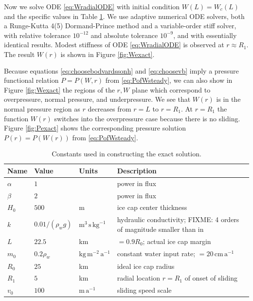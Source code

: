 \documentclass[11pt,final]{amsart}
\begin{document}
Now we solve ODE \eqref{eq:WradialODE} with initial condition $W(L)=W_c(L)$ and the specific values in Table \ref{tab:verifconstants}.  We use adaptive numerical ODE solvers, both a Runge-Kutta 4(5) Dormand-Prince method and a variable-order stiff solver, with relative tolerance $10^{-12}$ and absolute tolerance $10^{-9}$, and with essentially identical results.  Modest stiffness \citep{AscherPetzold} of ODE \eqref{eq:WradialODE} is observed at $r\approx R_1$.  The result $W(r)$ is shown in Figure \ref{fig:Wexact}.

Because equations \eqref{eq:choosebodvardssonh} and \eqref{eq:choosevb} imply a pressure functional relation $P=P(W,r)$ from \eqref{eq:PofWsteady}, we can also show in Figure \ref{fig:Wexact} the regions of the $r,W$ plane which correspond to overpressure, normal pressure, and underpressure.  We see that $W(r)$ is in the normal pressure region as $r$ decreases from $r=L$ to $r=R_1$.  At $r=R_1$ the function $W(r)$ switches into the overpressure case because there is no sliding.  Figure \ref{fig:Pexact} shows the corresponding pressure solution $P(r)=P(W(r))$ from \eqref{eq:PofWsteady}.

\begin{table}[ht]
  \centering
  \caption{Constants used in constructing the exact solution.}
  \begin{tabular}{lllp{3.0in}}
    \textbf{Name} & \textbf{Value} & \textbf{Units} & \textbf{Description}\\
\hline
    $\alpha$ & $1$ & & power in flux \\
    $\beta$  & $2$ & & power in flux \\
    $H_0$ & $500$ & m & ice cap center thickness \\
    $k$   & $0.01/(\rho_w g)$ & $\text{m}^3\,\text{s}\,\text{kg}^{-1}$ & hydraulic conductivity; FIXME: 4 orders of magnitude smaller than in \cite{Hewittetal2012} \\
    $L$   & $22.5$& km & $=0.9 R_0$; actual ice cap margin \\
    $m_0$ & $0.2\rho_w$ & $\text{kg}\,\text{m}^{-2}\,\text{a}^{-1}$ & constant water input rate; $= 20 \,\text{cm}\,\text{a}^{-1}$ \\
    $R_0$ & $25$  & km & ideal ice cap radius \\
    $R_1$ & $5$   & km & radial location $r=R_1$ of onset of sliding \\
    $v_0$ & $100$ & $\text{m}\,\text{a}^{-1}$ & sliding speed scale \\
    \hline
  \end{tabular}
 \label{tab:verifconstants}
\end{table}
\end{document}

